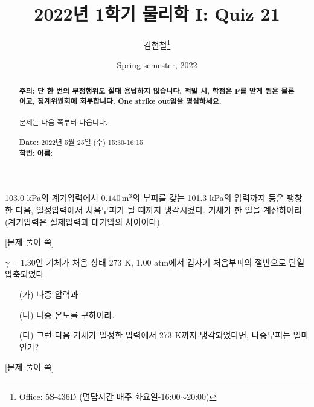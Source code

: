 \documentclass[floatfix,nofootinbib,superscriptaddress,fleqn,preprint]{revtex4-2}
\begin{document}
\title{\Large 2022년 1학기 물리학 I: Quiz 21}
\author{김현철\footnote{Office: 5S-436D (면담시간 매주
    화요일-16:00$\sim$20:00)}} 
\date{Spring semester, 2022}


\vspace{1.cm}
\begin{abstract}
\noindent \textbf{ {\color{red}주의}: \color{blue} 단 한 번의
  부정행위도 절대 용납하지 않습니다. 적발 시, 학점은 F를 받게 됨은
  물론이고, 징계위원회에 회부합니다. One strike out임을 명심하세요.}\\
\\
문제는 다음 쪽부터 나옵니다.  \\ \\
{\bf Date:} 2022년 5월 25일 (수) 15:30-16:15
\\
{\bf 학번:} \hspace{4cm}
{\bf 이름:} 

\end{abstract}
\maketitle

\newpage
{} 
103.0 kPa의 계기압력에서
$0.140\,\mathrm{m}^3$의 부피를 갖는 101.3 kPa의 압력까지 등온 팽창한
다음, 일정압력에서 처음부피가 될 때까지 냉각시켰다. 기체가 한 일을
계산하여라(계기압력은 실제압력과 대기압의 차이이다). 
 \newpage

{\color{gray} [문제 풀이 쪽]}

\newpage

$\gamma=1.30$인 기체가 처음 상태 273 
K, 1.00 atm에서 갑자기 처음부피의 절반으로 단열압축되었다.
\begin{itemize}
\item[(가)] 나중 압력과
\item[(나)] 나중 온도를 구하여라. 
\item[(다)] 그런 다음 기체가 일정한 압력에서 273 K까지 냉각되었다면,
  나중부피는 얼마인가?   
\end{itemize}
\newpage
{\color{gray} [문제 풀이 쪽]}

\newpage
\end{document}

